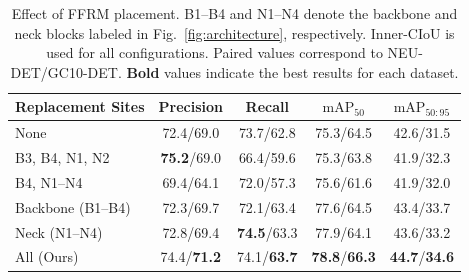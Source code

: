 \documentclass[pdflatex,sn-nature]{sn-jnl}
\begin{document}
\begin{table}[!t]
    \caption{Effect of FFRM placement. B1--B4 and N1--N4 denote the backbone and neck blocks labeled in Fig.~\ref{fig:architecture}, respectively. Inner-CIoU is used for all configurations. Paired values correspond to NEU-DET/GC10-DET. \textbf{Bold} values indicate the best results for each dataset.}
    \label{tab:placement}
    \centering
    \footnotesize
    \setlength{\tabcolsep}{3pt}
    \renewcommand{\arraystretch}{1.1}
    \begin{tabular*}{\textwidth}
    {@{\extracolsep{\fill}}lcccc@{}}
    \toprule
    Replacement Sites &
    Precision &
    Recall &
    $\mathrm{mAP}_{50}$ &
    $\mathrm{mAP}_{50:95}$ \\
    \midrule
    None
    & 72.4/69.0
    & 73.7/62.8
    & 75.3/64.5
    & 42.6/31.5 \\

    B3, B4, N1, N2
    & \textbf{75.2}/69.0
    & 66.4/59.6
    & 75.3/63.8
    & 41.9/32.3 \\

    B4, N1--N4
    & 69.4/64.1
    & 72.0/57.3
    & 75.6/61.6
    & 41.9/32.0 \\

    Backbone (B1--B4)
    & 72.3/69.7
    & 72.1/63.4
    & 77.6/64.5
    & 43.4/33.7 \\

    Neck (N1--N4)
    & 72.8/69.4
    & \textbf{74.5}/63.3
    & 77.9/64.1
    & 43.6/33.2 \\

    All (Ours)
    & 74.4/\textbf{71.2}
    & 74.1/\textbf{63.7}
    & \textbf{78.8}/\textbf{66.3}
    & \textbf{44.7}/\textbf{34.6} \\
    \bottomrule
    \end{tabular*}
\end{table}
\end{document}
